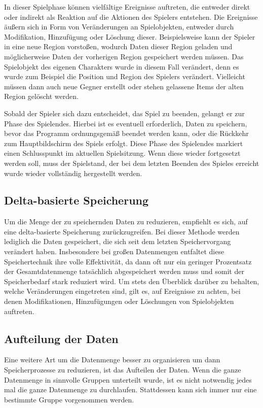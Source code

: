 In dieser Spielphase können vielfältige Ereignisse auftreten, die entweder direkt oder indirekt als Reaktion auf die Aktionen des Spielers entstehen. Die Ereignisse äußern sich in Form von Veränderungen an Spielobjekten, entweder durch Modifikation, Hinzufügung oder Löschung dieser. Beispielsweise kann der Spieler in eine neue Region vorstoßen, wodurch Daten dieser Region geladen und möglicherweise Daten der vorherigen Region gespeichert werden müssen. Das Spielobjekt des eigenen Charakters wurde in diesem Fall verändert, denn es wurde zum Beispiel die Position und Region des Spielers verändert. Vielleicht müssen dann auch neue Gegner erstellt oder stehen gelassene Items der alten Region gelöscht werden. 

Sobald der Spieler sich dazu entscheidet, das Spiel zu beenden, gelangt er zur Phase des Spielendes. Hierbei ist es eventuell erforderlich, Daten zu speichern, bevor das Programm ordnungsgemäß beendet werden kann, oder die Rückkehr zum Hauptbildschirm des Spiels erfolgt. Diese Phase des Spielendes markiert einen Schlusspunkt im aktuellen Spielsitzung. Wenn diese wieder fortgesetzt werden soll, muss der Spielstand, der bei dem letzten Beenden des Spieles erreicht wurde wieder vollständig hergestellt werden. 


\subsection{Delta-basierte Speicherung}
Um die Menge der zu speichernden Daten zu reduzieren, empfiehlt es sich, auf eine delta-basierte Speicherung zurückzugreifen. Bei dieser Methode werden lediglich die Daten gespeichert, die sich seit dem letzten Speichervorgang verändert haben. Insbesondere bei großen Datenmengen entfaltet diese Speichertechnik ihre volle Effektivität, da dann oft nur ein geringer Prozentsatz der Gesamtdatenmenge tatsächlich abgespeichert werden muss und somit der Speicherbedarf stark reduziert wird. Um stets den Überblick darüber zu behalten, welche Veränderungen eingetreten sind, gilt es, auf Ereignisse zu achten, bei denen Modifikationen, Hinzufügungen oder Löschungen von Spielobjekten auftreten.


\subsection{Aufteilung der Daten}
Eine weitere Art um die Datenmenge besser zu organisieren um dann Speicherprozesse zu reduzieren, ist das Aufteilen der Daten. Wenn die ganze Datenmenge in sinnvolle Gruppen unterteilt wurde, ist es nicht notwendig jedes mal die ganze Datenmenge zu durchlaufen. Stattdessen kann sich immer nur eine bestimmte Gruppe vorgenommen werden.

